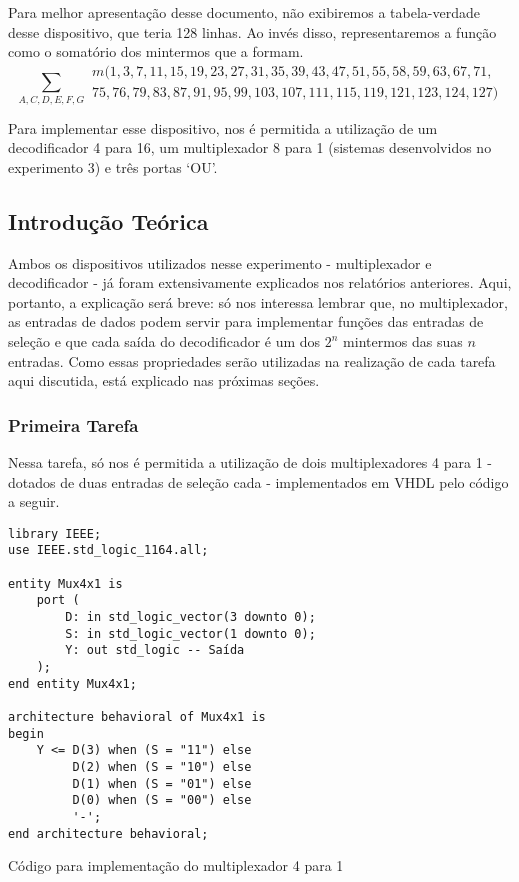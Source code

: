 \documentclass[a4paper,12pt]{article}
\newenvironment{code}{\captionsetup{type=listing}}{}
\begin{document}
Para melhor apresentação desse documento, não exibiremos a tabela-verdade desse dispositivo, que teria 128 linhas. Ao invés disso, representaremos a função como o somatório dos mintermos que a formam.
\begin{equation} \label{eq: q2}
\sum_{A,C,D,E,F,G} \substack{m(1,3,7,11,15,19,23,27,31,35,39,43,47,51,55,58,59,63,
67,71,\\75,76,79,83,87,91,95,99,103,107,111,115,119,121,123,124,127)}
\end{equation}


Para implementar esse dispositivo, nos é permitida a utilização de um decodificador 4 para 16, um multiplexador 8 para 1 (sistemas desenvolvidos no experimento 3) e três portas `OU'.

\subsection{Introdução Teórica}
 Ambos os dispositivos utilizados nesse experimento - multiplexador e decodificador - já foram extensivamente explicados nos relatórios anteriores. Aqui, portanto, a explicação será breve: só nos interessa lembrar que, no multiplexador, as entradas de dados podem servir para implementar funções das entradas de seleção e que cada saída do decodificador é um dos $2^n$ mintermos das suas $n$ entradas. Como essas propriedades serão utilizadas na realização de cada tarefa aqui discutida, está explicado nas próximas seções.

\subsubsection{Primeira Tarefa}

Nessa tarefa, só nos é permitida a utilização de dois multiplexadores 4 para 1 - dotados de duas entradas de seleção cada - implementados em VHDL pelo código a seguir.
\begin{code}
\begin{verbatim}
library IEEE;
use IEEE.std_logic_1164.all;

entity Mux4x1 is
    port (
        D: in std_logic_vector(3 downto 0);
        S: in std_logic_vector(1 downto 0);
        Y: out std_logic -- Saída
    );
end entity Mux4x1;

architecture behavioral of Mux4x1 is
begin
    Y <= D(3) when (S = "11") else
         D(2) when (S = "10") else
         D(1) when (S = "01") else
         D(0) when (S = "00") else
         '-';
end architecture behavioral;
\end{verbatim}
\caption{Código para implementação do multiplexador 4 para 1}
\end{code}
\end{document}
